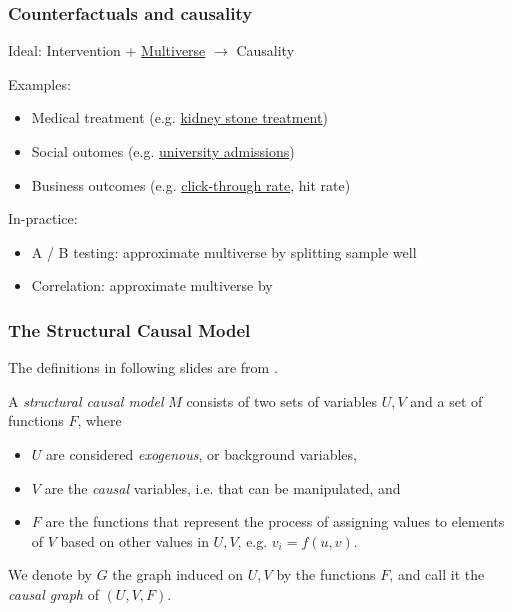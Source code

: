 \begin{frame}
\frametitle{Counterfactuals and causality}
Ideal: Intervention + \href{https://en.wikipedia.org/wiki/Multiverse}{Multiverse} $\rightarrow$ Causality

Examples:
\begin{itemize}
\item Medical treatment (e.g. \href{https://en.wikipedia.org/wiki/Simpson\%27s_paradox\#Kidney_stone_treatment}{kidney stone treatment})
\item Social outomes (e.g. \href{https://en.wikipedia.org/wiki/Simpson\%27s_paradox\#UC_Berkeley_gender_bias}{university admissions})
\item Business outcomes (e.g. \href{https://en.wikipedia.org/wiki/Click-through\_rate}{click-through rate}, hit rate)
\end{itemize}

In-practice:
\begin{itemize}
\item A / B testing: approximate multiverse by splitting sample well
\item Correlation: approximate multiverse by 
\end{itemize}

\end{frame}

\begin{frame}
    \frametitle{The Structural Causal Model}
    The definitions in following slides are from \cite{pearl2007mathematics}.

    A \emph{structural causal model} $M$ consists of two sets of variables $U, V$ and a set of functions $F$, where 
    
    \begin{itemize}
        \item $U$ are considered \emph{exogenous}, or background variables, 
        \item $V$ are the \emph{causal} variables, i.e. that can be manipulated, and
        \item $F$ are the functions that represent the process of assigning values to elements of $V$ based on other values in $U, V$, e.g. $v_i = f(u, v)$.
    \end{itemize}

    We denote by $G$ the graph induced on $U, V$ by the functions $F$, and call it the \emph{causal graph} of $(U, V, F)$.
\end{frame}

